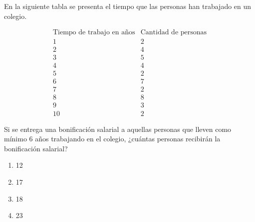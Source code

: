 \begin{problem}
    En la siguiente tabla se presenta el tiempo que las personas han trabajado en un colegio.

    \[
    \begin{array}{c|c}
    \text{Tiempo de trabajo en años} & \text{Cantidad de personas} \\
    \hline
    1 & 2 \\
    2 & 4 \\
    3 & 5 \\
    4 & 4 \\
    5 & 2 \\
    6 & 7 \\
    7 & 2 \\
    8 & 8 \\
    9 & 3 \\
    10 & 2
    \end{array}
    \]

    Si se entrega una bonificación salarial a aquellas personas que lleven como mínimo 6 años trabajando en el colegio, ¿cuántas personas recibirán la bonificación salarial?

    \begin{enumerate}[label=\Alph*.]
        \item 12
        \item 17
        \item 18
        \item 23
    \end{enumerate}
\end{problem}
